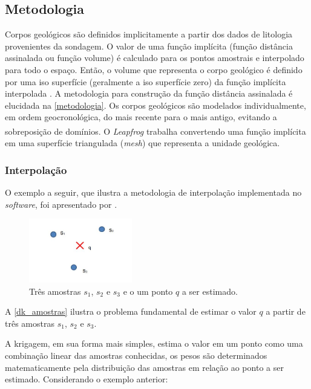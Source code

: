  \subsection{Metodologia}
 
Corpos geológicos são definidos implicitamente a partir dos dados de litologia provenientes da sondagem. O valor de uma função implícita (função distância assinalada ou função volume) é calculado para os pontos amostrais e interpolado para todo o espaço. Então, o volume que representa o corpo geológico é definido por uma iso superfície (geralmente a iso superfície zero) da função implícita interpolada \cite{cowan2003practical}. A metodologia para construção da função distância assinalada é elucidada na \autoref{metodologia}. Os corpos geológicos são modelados individualmente, em ordem geocronológica, do mais recente para o mais antigo, evitando a sobreposição de domínios. O \textit{Leapfrog}\textsuperscript{\textregistered} trabalha convertendo uma função implícita em uma superfície triangulada (\textit{mesh}) que representa a unidade geológica.

\subsubsection{Interpolação}

O exemplo a seguir, que ilustra a metodologia de interpolação implementada no \textit{software}, foi apresentado por .

\begin{figure}[!htb]
	\caption{\label{dk_amostras}Três amostras $s_1$, $s_2$ e $s_3$ e o um ponto $q$ a ser estimado.}
	\begin{center}
		\includegraphics[width=0.4\textwidth]{revisao_bibliografica/dual_krig_amostras}
	\end{center}
\end{figure}

A \autoref{dk_amostras} ilustra o problema fundamental de estimar o valor $q$ a partir de três amostras $s_1$, $s_2$ e $s_3$.

A krigagem, em sua forma mais simples, estima o valor em um ponto como uma combinação linear das amostras conhecidas, os pesos são determinados matematicamente pela distribuição das amostras em relação ao ponto a ser estimado. Considerando o exemplo anterior:

